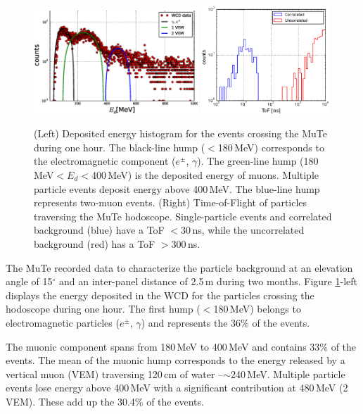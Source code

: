 \documentclass{PoS}
\begin{document}
\begin{figure}[!h]
\begin{center}
\includegraphics[width=0.55\textwidth]{Figures/Noise_class.eps}
\includegraphics[width=0.43\textwidth]{Figures/ToF_corr_uncorr.eps}
\caption{(Left) Deposited energy histogram for the events crossing the MuTe during one hour. The black-line hump ($<$180\,MeV) corresponds to the electromagnetic component ($e^{\pm}$, $\gamma$). The green-line hump (180\,MeV$<E_d<$400\,MeV) is the deposited energy of muons. Multiple particle events deposit energy above 400\,MeV. The blue-line hump represents two-muon events. (Right) Time-of-Flight of particles traversing the MuTe hodoscope. Single-particle events and correlated background (blue) have a ToF $<$30\,ns, while the uncorrelated background (red) has a ToF $>$300\,ns.}
\label{Rejection}
\end{center}
\end{figure}

The MuTe recorded data to characterize the particle background at an elevation angle of 15$^{\circ}$ and an inter-panel distance of 2.5\,m during two months. Figure \ref{Rejection}-left displays the energy deposited in the WCD for the particles crossing the hodoscope during one hour. The first hump ($<$180\,MeV) belongs to electromagnetic particles ($e^{\pm}$, $\gamma$) and represents the 36$\%$ of the events.

The muonic component spans from 180\,MeV to 400\,MeV and contains 33$\%$ of the events. The mean of the muonic hump corresponds to the energy released by a vertical muon (VEM) traversing 120\,cm of water --$\sim$240\,MeV. Multiple particle events lose energy above 400\,MeV with a significant contribution at 480\,MeV (2 VEM). These add up the 30.4$\%$ of the events.
\end{document}
